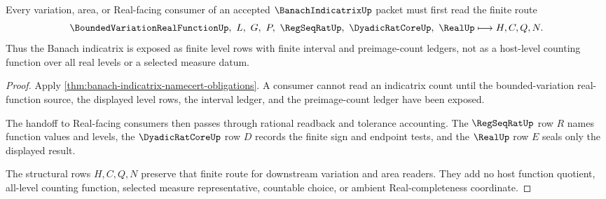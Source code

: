 \begin{theorem}
\label{thm:banach-indicatrix-finite-level-count-route}
Every variation, area, or Real-facing consumer of an accepted $\BanachIndicatrixUp$ packet must first read the finite route
$$
\BoundedVariationRealFunctionUp,\ L,\ G,\ P,\ \RegSeqRatUp,\ \DyadicRatCoreUp,\ \RealUp \longmapsto H,C,Q,N .
$$
Thus the Banach indicatrix is exposed as finite level rows with finite interval and preimage-count ledgers, not as a host-level counting function over all real levels or a selected measure datum.
\end{theorem}
\begin{proof}
Apply \autoref{thm:banach-indicatrix-namecert-obligations}. A consumer cannot read an indicatrix count until the bounded-variation real-function source, the displayed level rows, the interval ledger, and the preimage-count ledger have been exposed.

The handoff to Real-facing consumers then passes through rational readback and tolerance accounting. The $\RegSeqRatUp$ row $R$ names function values and levels, the $\DyadicRatCoreUp$ row $D$ records the finite sign and endpoint tests, and the $\RealUp$ row $E$ seals only the displayed result.

The structural rows $H,C,Q,N$ preserve that finite route for downstream variation and area readers. They add no host function quotient, all-level counting function, selected measure representative, countable choice, or ambient Real-completeness coordinate.
\end{proof}





